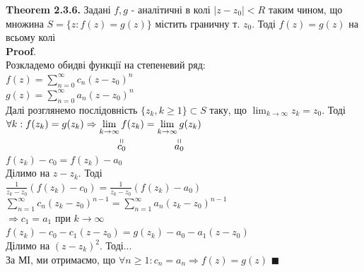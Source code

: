 \documentclass[a4paper, 14pt]{extarticle}
\def\stackbelow#1#2{\underset{\displaystyle\overset{\displaystyle\shortparallel}{#2}}{#1}}
\def\hugespace{\vspace{5mm} \\}
\begin{document}
	\textbf{Theorem 2.3.6.} Задані $f,g$ - аналітичні в колі $|z-z_0|<R$ таким чином, що множина $S=\{z: f(z)=g(z)\}$ містить граничну т. $z_0$. Тоді $f(z)=g(z)$ на всьому колі\\
	\textbf{Proof}.\\
	Розкладемо обидві функції на степеневий ряд:\\
	$\displaystyle f(z)=\sum_{n=0}^{\infty} c_n(z-z_0)^n$\\
	$\displaystyle g(z)=\sum_{n=0}^{\infty} a_n(z-z_0)^n$\\
	Далі розглянемо послідовність $\{z_k, k\geq 1\} \subset S$ таку, що $\displaystyle\lim_{k\to\infty} z_k = z_0$. Тоді $\forall k: f(z_k)=g(z_k) \Rightarrow \stackbelow{\displaystyle\lim_{k\to\infty} f(z_k)}{c_0} = \stackbelow{\displaystyle\lim_{k\to\infty} g(z_k)}{a_0}$\\
	$f(z_k)-c_0=f(z_k)-a_0$\\
	Ділимо на $z-z_k$. Тоді\\
	$\displaystyle \frac{1}{z_k-z_0}(f(z_k)-c_0) = \frac{1}{z_k-z_0}(f(z_k)-a_0)$\\
	$\displaystyle \sum_{n=1}^{\infty} c_n(z_k-z_0)^{n-1} = \sum_{n=1}^{\infty} a_n(z_k-z_0)^{n-1}$\\
	$\Rightarrow c_1 = a_1$ при $k\to\infty$\\
	$f(z_k)-c_0-c_1(z-z_0) = g(z_k)-a_0-a_1(z-z_0)$\\
	Ділимо на $(z-z_k)^2$. Тоді...\\
	За МІ, ми отримаємо, що $\forall n \geq 1: c_n = a_n \Rightarrow f(z)=g(z)$ $\blacksquare$
	\hugespace
	
\end{document}
